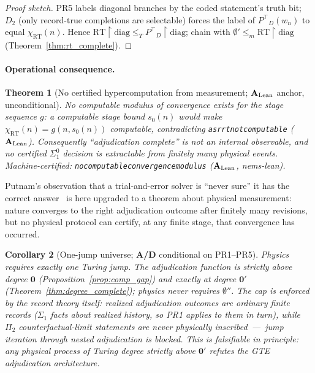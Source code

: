 \documentclass[11pt]{article}
\newtheorem{theorem}{Theorem}[section]
\newtheorem{corollary}[theorem]{Corollary}
\theoremstyle{remark}
\newcommand{\lean}[1]{%
  \penalty-100
  \begingroup\def\_{\textunderscore\allowbreak}\texttt{#1}\endgroup}
\newcommand{\Ptop}{\ensuremath{P^{\top}}}
\newcommand{\CatAL}{\ensuremath{\textbf{A}_{\rm Lean}}}
\newcommand{\CatAD}{\textbf{A/D}}
\begin{document}
\begin{proof}[Proof sketch]
PR5 labels diagonal branches by the coded statement's truth bit; $D_2$
(only record-true completions are selectable) forces the label of
$\Ptop_D(w_n)$ to equal $\chi_{\mathrm{RT}}(n)$. Hence
$\mathrm{RT}{\upharpoonright}\mathrm{diag} \leq_T
\Ptop_D{\upharpoonright}\mathrm{diag}$; chain with
$\emptyset' \leq_m \mathrm{RT}{\upharpoonright}\mathrm{diag}$
(Theorem~\ref{thm:rt_complete}).
\end{proof}

\paragraph{Operational consequence.}

\begin{theorem}[No certified hypercomputation from measurement; \CatAL{}
  anchor, unconditional]
\label{thm:no_modulus}
No computable modulus of convergence exists for the stage sequence $g$: a
computable stage bound $s_0(n)$ would make
$\chi_{\mathrm{RT}}(n) = g(n, s_0(n))$ computable, contradicting
\lean{asr\_rt\_not\_computable} (\CatAL).
Consequently ``adjudication complete'' is not an internal observable, and
no certified $\Sigma^0_1$ decision is extractable from finitely many
physical events. Machine-certified:
\lean{no\_computable\_convergence\_modulus} (\CatAL, nems-lean).
\end{theorem}

Putnam's observation that a trial-and-error solver is ``never sure'' it has
the correct answer~\cite{Putnam1965} is here upgraded to a theorem about
physical measurement: nature converges to the right adjudication outcome
after finitely many revisions, but no physical protocol can certify, at any
finite stage, that convergence has occurred.

\begin{corollary}[One-jump universe; \CatAD{} conditional on PR1--PR5]
\label{cor:one_jump}
Physics requires exactly one Turing jump. The adjudication function is
strictly above degree $\mathbf{0}$ (Proposition~\ref{prop:comp_gap}) and
exactly at degree $\mathbf{0}'$ (Theorem~\ref{thm:degree_complete});
physics never requires $\emptyset''$. The cap is enforced by the record
theory itself: realized adjudication outcomes are ordinary finite records
($\Sigma_1$ facts about realized history, so PR1 applies to them in turn),
while $\Pi_2$ counterfactual-limit statements are never physically
inscribed~---~jump iteration through nested adjudication is blocked.
This is falsifiable in principle: any physical process of Turing degree
strictly above $\mathbf{0}'$ refutes the GTE adjudication architecture.
\end{corollary}
\end{document}
